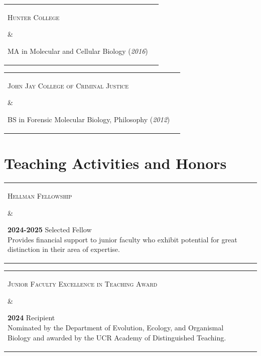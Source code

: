 \documentclass[]{article}
\begin{document}
\vspace{3mm}

\begin{tabular}{l | l}
\parbox{0.30\textwidth}{
\begin{center}
\textsc{Hunter College}
\end{center}
}
&
\parbox{0.65\textwidth}{
MA in Molecular and Cellular Biology (\textit{2016})
}
\end{tabular}

\vspace{3mm}

\begin{tabular}{l | l}
\parbox{0.30\textwidth}{
\begin{center}
\textsc{John Jay College of Criminal Justice}
\end{center}
}
&
\parbox{0.65\textwidth}{
BS in Forensic Molecular Biology, Philosophy (\textit{2012})
}
\end{tabular}

\vspace{3mm}

\section{\fontsize{16}{48}\selectfont Teaching Activities and Honors}

\begin{tabular}{l | l}
\parbox{0.30\textwidth}{
\begin{center}
\textsc{Hellman Fellowship}
\end{center}
}
&
\parbox{0.65\textwidth}{
\textbf{2024-2025} Selected Fellow\\
Provides financial support to junior faculty who exhibit potential for great distinction in their area of expertise.
}
\end{tabular}

\vspace{4mm}


\begin{tabular}{l | l}
\parbox{0.30\textwidth}{
\begin{center}
\textsc{Junior Faculty Excellence in Teaching Award}
\end{center}
}
&
\parbox{0.65\textwidth}{
\textbf{2024} Recipient\\
Nominated by the Department of Evolution, Ecology, and Organismal Biology and awarded by the UCR Academy of Distinguished Teaching.}
\end{tabular}

\vspace{4mm}
\end{document}
